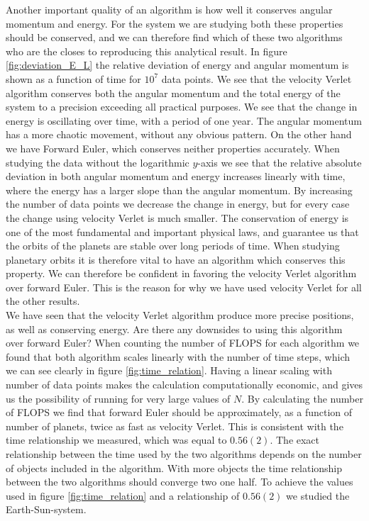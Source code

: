 \documentclass[%
 reprint,
nofootinbib,
aps,
]{revtex4-1}
\begin{document}
Another important quality of an algorithm is how well it conserves angular momentum and energy. For the system we are studying both these properties should be conserved, and we can therefore find which of these two algorithms who are the closes to reproducing this analytical result. In figure \vref{fig:deviation_E_L} the relative deviation of energy and angular momentum is shown as a function of time for $10^{7}$ data points. We see that the velocity Verlet algorithm conserves both the angular momentum and the total energy of the system to a precision exceeding all practical purposes. We see that the change in energy is oscillating over time, with a period of one year. The angular momentum has a more chaotic movement, without any obvious pattern. On the other hand we have Forward Euler, which conserves neither properties accurately. When studying the data without the logarithmic $y$-axis we see that the relative absolute deviation in both angular momentum and energy increases linearly with time, where the energy has a larger slope than the angular momentum. By increasing the number of data points we decrease the change in energy, but for every case the change using velocity Verlet is much smaller. The conservation of energy is one of the most fundamental and important physical laws, and guarantee us that the orbits of the planets are stable over long periods of time. When studying planetary orbits it is therefore vital to have an algorithm which conserves this property. We can therefore be confident in favoring the velocity Verlet algorithm over forward Euler. This is the reason for why we have used velocity Verlet for all the other results.\\
We have seen that the velocity Verlet algorithm produce more precise positions, as well as conserving energy. Are there any downsides to using this algorithm over forward Euler? When counting the number of FLOPS for each algorithm we found that both algorithm scales linearly with the number of time steps, which we can see clearly in figure \vref{fig:time_relation}. Having a linear scaling with number of data points makes the calculation computationally economic, and gives us the possibility of running for very large values of $N$. By calculating the number of FLOPS we find that forward Euler should be approximately, as a function of number of planets, twice as fast as velocity Verlet. This is consistent with the time relationship we measured, which was equal to $0.56(2)$. The exact relationship between the time used by the two algorithms depends on the number of objects included in the algorithm. With more objects the time relationship between the two algorithms should converge two one half. To achieve the values used in figure \vref{fig:time_relation} and a relationship of $0.56(2)$ we studied the Earth-Sun-system.\par
\end{document}
